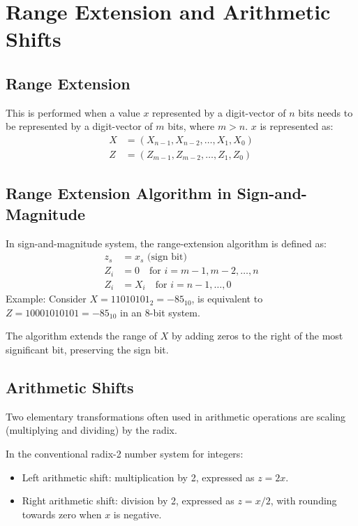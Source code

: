 \documentclass[10pt,a4paper]{book}
\begin{document}
\section{Range Extension and Arithmetic Shifts}
\subsection{Range Extension}
This is performed when a value $x$ represented by a digit-vector of $n$ bits needs to be represented by a digit-vector of $m$ bits, where $m > n$. $x$ is represented as:
\begin{align*}
	X & = (X_{n-1}, X_{n-2}, \ldots, X_1, X_0) \\
	Z & = (Z_{m-1}, Z_{m-2}, \ldots, Z_1, Z_0) 
\end{align*}

\subsection{Range Extension Algorithm in Sign-and-Magnitude}
In sign-and-magnitude system, the range-extension algorithm is defined as:
\begin{align*}
	z_s & = x_s \text{ (sign bit)}                          \\
	Z_i & = 0 \quad \text{for } i = m - 1, m - 2, \ldots, n \\
	Z_i & = X_i \quad \text{for } i = n - 1, \ldots, 0      
\end{align*}
Example: Consider $X = 11010101_2 = -85_{10}$, is equivalent to $Z = 10001010101 = -85_{10}$ in an 8-bit system.\par
The algorithm extends the range of \( X \) by adding zeros to the right of the most significant bit, preserving the sign bit.	
	
\subsection{Arithmetic Shifts}
Two elementary transformations often used in arithmetic operations are scaling (multiplying and dividing) by the radix.\par 
In the conventional radix-2 number system for integers:
\begin{itemize}
	\item[] Left arithmetic shift: multiplication by 2, expressed as \( z = 2x \).
	\item[] Right arithmetic shift: division by 2, expressed as \( z = x/2 \), with rounding towards zero when \( x \) is negative.
\end{itemize}
	
\end{document}
